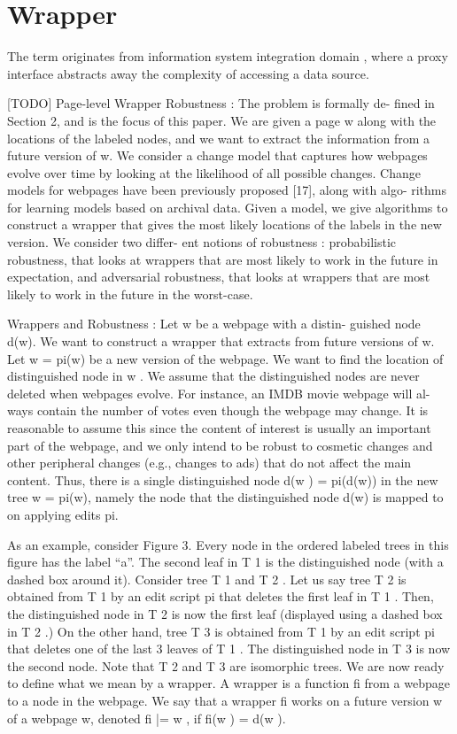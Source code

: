 
\cite{de2004a}

\section{Wrapper}

The term originates from information system integration domain \cite{Chang:2006:SWI:1159162.1159300}, where a proxy interface abstracts away the complexity of accessing a data source. 


[TODO] Page-level Wrapper Robustness : The problem is formally de-
fined in Section 2, and is the focus of this paper. We are given a
page w along with the locations of the labeled nodes, and we want
to extract the information from a future version of w. We consider
a change model that captures how webpages evolve over time by
looking at the likelihood of all possible changes. Change models
for webpages have been previously proposed [17], along with algo-
rithms for learning models based on archival data. Given a model,
we give algorithms to construct a wrapper that gives the most likely
locations of the labels in the new version. We consider two differ-
ent notions of robustness : probabilistic robustness, that looks at
wrappers that are most likely to work in the future in expectation,
and adversarial robustness, that looks at wrappers that are most
likely to work in the future in the worst-case.

Wrappers and Robustness : Let w be a webpage with a distin-
guished node d(w). We want to construct a wrapper that extracts
from future versions of w. Let w = pi(w) be a new version of the
webpage. We want to find the location of distinguished node in w .
We assume that the distinguished nodes are never deleted when
webpages evolve. For instance, an IMDB movie webpage will al-
ways contain the number of votes even though the webpage may
change. It is reasonable to assume this since the content of interest
is usually an important part of the webpage, and we only intend to
be robust to cosmetic changes and other peripheral changes (e.g.,
changes to ads) that do not affect the main content. Thus, there
is a single distinguished node d(w ) = pi(d(w)) in the new tree
w = pi(w), namely the node that the distinguished node d(w) is
mapped to on applying edits pi.

As an example, consider Figure 3. Every node in the ordered
labeled trees in this figure has the label “a”. The second leaf in T 1 is
the distinguished node (with a dashed box around it). Consider tree
T 1 and T 2 . Let us say tree T 2 is obtained from T 1 by an edit script
pi that deletes the first leaf in T 1 . Then, the distinguished node in
T 2 is now the first leaf (displayed using a dashed box in T 2 .) On
the other hand, tree T 3 is obtained from T 1 by an edit script pi that
deletes one of the last 3 leaves of T 1 . The distinguished node in T 3
is now the second node. Note that T 2 and T 3 are isomorphic trees.
We are now ready to define what we mean by a wrapper.
A wrapper is a function fi from a webpage to a node in the
webpage. We say that a wrapper fi works on a future version
w of a webpage w, denoted fi |= w , if fi(w ) = d(w ).

